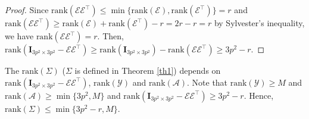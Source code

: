 \begin{proof} Since $\text{rank}(\mathcal{E}\mathcal{E}^{\top})\le\min\{\text{rank}(\mathcal{E}),\text{rank}(\mathcal{E}^{\top})\}=r$ and $\text{rank}(\mathcal{E}\mathcal{E}^{\top})\ge\text{rank}(\mathcal{E})+\text{rank}(\mathcal{E}^{\top})-r=2r-r=r$ by Sylvester's inequality, we have $\text{rank}(\mathcal{E}\mathcal{E}^{\top})=r$. Then, $\text{rank}(\bm{I}_{3p^2\times 3p^2}-\mathcal{E}\mathcal{E}^{\top})\ge\text{rank}(\bm{I}_{3p^2\times 3p^2})-\text{rank}(\mathcal{E}\mathcal{E}^{\top})\ge 3p^2-r$. 
\end{proof}

The $\text{rank}(\Sigma)$ ($\Sigma$ is defined in Theorem \ref{th1}) depends on $\text{rank}(\bm{I}_{3p^2\times 3p^2}-\mathcal{E}\mathcal{E}^{\top})$, $\text{rank}(\mathcal{Y})$ and $\text{rank}(\mathcal{A})$. Note that $\text{rank}(\mathcal{Y})\ge M$ and $\text{rank}(\mathcal{A})\ge \min\{3p^2,M\}$ and $\text{rank}(\bm{I}_{3p^2\times 3p^2}-\mathcal{E}\mathcal{E}^{\top})\ge 3p^2-r$. Hence, $\text{rank}(\Sigma)\le\min\{3p^2-r,M\}$.

